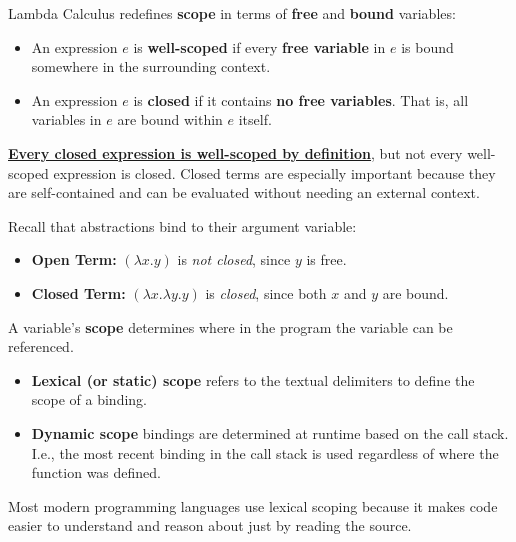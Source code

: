 \newpage 

    
\begin{Def}

    \label{def:well-scopedness}

    Lambda Calculus redefines \textbf{scope} in terms of \textbf{free} and \textbf{bound} variables: 

    \begin{itemize}
        \item 
    An expression \( e \) is \textbf{well-scoped} if every \textbf{free variable} in \( e \) is bound somewhere in the surrounding context.

    \item 
    An expression \( e \) is \textbf{closed} if it contains \textbf{no free variables}. That is, all variables in \( e \) are bound within \( e \) itself.
    \end{itemize}
    \noindent
    \underline{\textbf{Every closed expression is well-scoped by definition}}, but not every well-scoped expression is closed.
    Closed terms are especially important because they are self-contained and can be evaluated without needing an external context.
\end{Def}

\begin{Example}
    
    Recall that abstractions bind to their argument variable:
    \begin{itemize}
        \item \textbf{Open Term:} \((\lambda x. y)\) is \emph{not closed}, since \(y\) is free.
        \item \textbf{Closed Term:} \((\lambda x. \lambda y. y)\) is \emph{closed}, since both \(x\) and \(y\) are bound.
    \end{itemize}

\end{Example}

\begin{Def}

    \label{def:scope}

    \noindent
    A variable's \textbf{scope} determines where in the program the variable can be referenced.

    \begin{itemize}
        \item \textbf{Lexical (or static) scope} refers to the textual delimiters to define the scope of a binding.
        
        \item \textbf{Dynamic scope} bindings are determined at runtime based on the call stack. I.e., the most recent binding in the call stack is used regardless 
        of where the function was defined.
    \end{itemize}

    \noindent
    Most modern programming languages use lexical scoping because it makes code easier to understand and reason about just by reading the source.
\end{Def}

